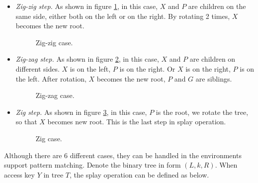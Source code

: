 \documentclass{article}
\begin{document}
\begin{itemize}
\item {\em Zig-zig step.} As shown in figure \ref{fig:zig-zig}, in this case,
$X$ and $P$ are children on the same side, either both on the left or on the right. By
rotating 2 times, $X$ becomes the new root.

\begin{figure}[htbp]
  \centering
  \caption{Zig-zig case.} \label{fig:zig-zig}
\end{figure}

\item {\em Zig-zag step.} As shown in figure \ref{fig:zig-zag}, in this
case, $X$ and $P$ are children on different sides. $X$ is on the left,
$P$ is on the right. Or $X$ is on the right, $P$ is on the left.
After rotation, $X$ becomes the new root, $P$ and $G$ are siblings.

\begin{figure}[htbp]
  \centering
  \caption{Zig-zag case.} \label{fig:zig-zag}
\end{figure}

\item {\em Zig step.} As shown in figure \ref{fig:zig}, in this case,
$P$ is the root, we rotate the tree, so that $X$ becomes new root.
This is the last step in splay operation.

\begin{figure}[htbp]
  \centering
  \caption{Zig case.} \label{fig:zig}
\end{figure}

\end{itemize}

Although there are 6 different cases, they can be handled in the
environments support pattern matching. Denote the binary tree
in form $(L, k, R)$. When access key $Y$ in tree $T$, the splay
operation can be defined as below.
\end{document}
